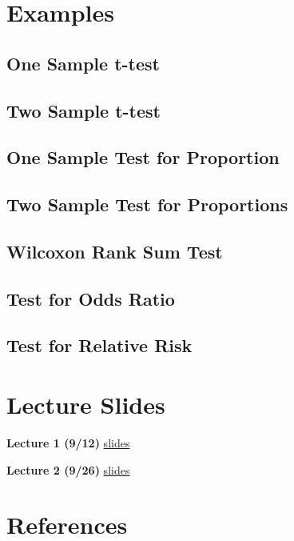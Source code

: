 \documentclass[]{book}
\theoremstyle{definition}
\theoremstyle{definition}
\theoremstyle{definition}
\theoremstyle{remark}
\begin{document}
\hypertarget{examples-6}{%
\chapter{Examples}\label{examples-6}}

\hypertarget{one-sample-t-test}{%
\section{One Sample t-test}\label{one-sample-t-test}}

\hypertarget{two-sample-t-test}{%
\section{Two Sample t-test}\label{two-sample-t-test}}

\hypertarget{one-sample-test-for-proportion}{%
\section{One Sample Test for Proportion}\label{one-sample-test-for-proportion}}

\hypertarget{two-sample-test-for-proportions}{%
\section{Two Sample Test for Proportions}\label{two-sample-test-for-proportions}}

\hypertarget{wilcoxon-rank-sum-test}{%
\section{Wilcoxon Rank Sum Test}\label{wilcoxon-rank-sum-test}}

\hypertarget{test-for-odds-ratio}{%
\section{Test for Odds Ratio}\label{test-for-odds-ratio}}

\hypertarget{test-for-relative-risk}{%
\section{Test for Relative Risk}\label{test-for-relative-risk}}

\hypertarget{appendix-appendix}{%
\appendix}


\hypertarget{lecture-slides}{%
\chapter{Lecture Slides}\label{lecture-slides}}

\textbf{Lecture 1 (9/12)} \href{./lectures/lecture01/lec01_slides.html}{slides}

\textbf{Lecture 2 (9/26)} \href{./lectures/lecture02/lec02_slides.html}{slides}

\hypertarget{references}{%
\chapter*{References}\label{references}}


\end{document}
